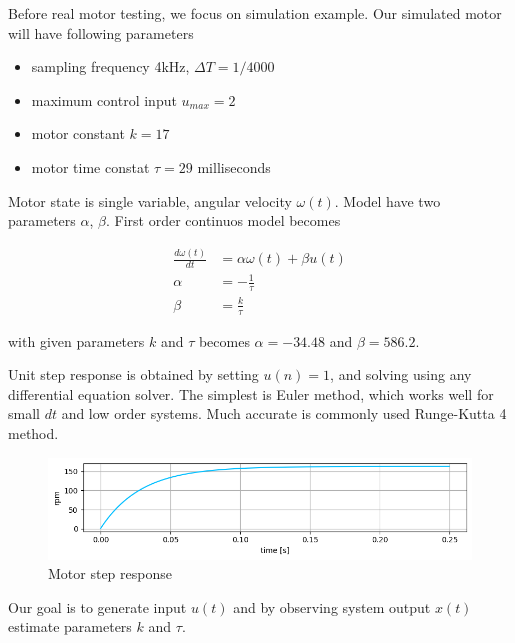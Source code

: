 \documentclass[12pt,twoside,onecolumn,openany,extrafontsizes,dvipsnames]{memoir}
\begin{document}
        Before real motor testing, we focus on simulation example.
        Our simulated motor will have following parameters

        \begin{itemize}
            \item sampling frequency 4kHz, $\Delta T = 1/4000$
            \item maximum control input $u_{max} = 2$
            \item motor constant $k = 17$
            \item motor time constat $\tau = 29$ milliseconds
        \end{itemize}

        Motor state is single variable, angular velocity $\omega(t)$. Model have two parameters $\alpha$, $\beta$. 
        First order continuos model becomes

        \begin{align}
            \frac{d\omega(t)}{dt} &= \alpha \omega(t) + \beta u(t) \label{eq:first_order_system_a} \\
            \alpha &= -\frac{1}{\tau}  \label{eq:first_order_system_b} \\
            \beta &= \frac{k}{\tau}  \label{eq:first_order_system_c}
        \end{align}

        with given parameters $k$ and $\tau$ becomes $\alpha = -34.48$ and $\beta = 586.2$.

        Unit step response is obtained by setting $u(n) = 1$, and solving using any differential 
        equation solver. The simplest is Euler method, which works well for small $dt$ and low order 
        systems. Much accurate is commonly used Runge-Kutta 4 method.

        \begin{figure}[!htb]
            \centering
            \includegraphics[scale=0.6]{../images/motor_control/motor_step_response.png}
            \caption{Motor step response}
            \label{fig:motor_step_response}
        \end{figure}

        Our goal is to generate input $u(t)$ and by observing system output $x(t)$ estimate parameters
        $k$ and $\tau$.
\end{document}
